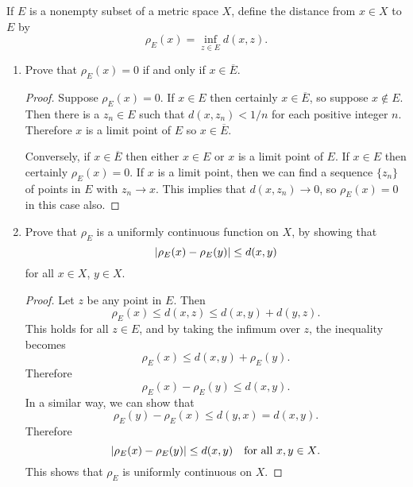 \label{exercise:continuity:point-to-set-distance}
If $E$ is a nonempty subset of a metric space $X$, define the distance
from $x\in X$ to $E$ by
\begin{equation*}
  \rho_E(x) = \inf_{z\in E} d(x,z).
\end{equation*}
\begin{enumerate}
\item Prove that $\rho_E(x) = 0$ if and only if $x\in\overline{E}$.
  \begin{proof}
    Suppose $\rho_E(x) = 0$. If $x\in E$ then certainly
    $x\in\overline{E}$, so suppose $x\not\in E$. Then there is a
    $z_n\in E$ such that $d(x,z_n) < 1/n$ for each positive integer
    $n$. Therefore $x$ is a limit point of $E$ so $x\in\overline{E}$.

    Conversely, if $x\in\overline{E}$ then either $x\in E$ or $x$ is a
    limit point of $E$. If $x\in E$ then certainly $\rho_E(x) = 0$. If
    $x$ is a limit point, then we can find a sequence $\{z_n\}$ of
    points in $E$ with $z_n\to x$. This implies that $d(x,z_n)\to0$,
    so $\rho_E(x) = 0$ in this case also.
  \end{proof}
\item Prove that $\rho_E$ is a uniformly continuous function on $X$,
  by showing that
  \begin{equation*}
    \lvert{\rho_E(x) - \rho_E(y)}\rvert \leq d(x,y)
  \end{equation*}
  for all $x\in X$, $y\in X$.
  \begin{proof}
    Let $z$ be any point in $E$. Then
    \begin{equation*}
      \rho_E(x) \leq d(x,z) \leq d(x,y) + d(y,z).
    \end{equation*}
    This holds for all $z\in E$, and by taking the infimum over $z$,
    the inequality becomes
    \begin{equation*}
      \rho_E(x) \leq d(x,y) + \rho_E(y).
    \end{equation*}
    Therefore
    \begin{equation*}
      \rho_E(x) - \rho_E(y) \leq d(x,y).
    \end{equation*}
    In a similar way, we can show that
    \begin{equation*}
      \rho_E(y) - \rho_E(x) \leq d(y,x) = d(x,y).
    \end{equation*}
    Therefore
    \begin{equation*}
      \lvert{\rho_E(x) - \rho_E(y)}\rvert \leq d(x,y)
      \quad\text{for all $x,y\in X$}.
    \end{equation*}
    This shows that $\rho_E$ is uniformly continuous on $X$.
  \end{proof}
\end{enumerate}

